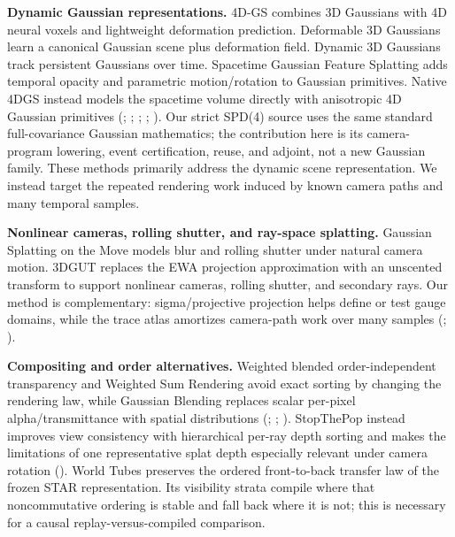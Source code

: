 \documentclass[
]{article}
\begin{document}
\textbf{Dynamic Gaussian representations.} 4D-GS combines 3D Gaussians
with 4D neural voxels and lightweight deformation prediction. Deformable
3D Gaussians learn a canonical Gaussian scene plus deformation field.
Dynamic 3D Gaussians track persistent Gaussians over time. Spacetime
Gaussian Feature Splatting adds temporal opacity and parametric
motion/rotation to Gaussian primitives. Native 4DGS instead models the
spacetime volume directly with anisotropic 4D Gaussian primitives
(;
;
;
;
). Our strict
SPD(4) source uses the same standard full-covariance Gaussian
mathematics; the contribution here is its camera-program lowering, event
certification, reuse, and adjoint, not a new Gaussian family. These
methods primarily address the dynamic scene representation. We instead
target the repeated rendering work induced by known camera paths and
many temporal samples.

\textbf{Nonlinear cameras, rolling shutter, and ray-space splatting.}
Gaussian Splatting on the Move models blur and rolling shutter under
natural camera motion. 3DGUT replaces the EWA projection approximation
with an unscented transform to support nonlinear cameras, rolling
shutter, and secondary rays. Our method is complementary:
sigma/projective projection helps define or test gauge domains, while
the trace atlas amortizes camera-path work over many samples
(;
).

\textbf{Compositing and order alternatives.} Weighted blended
order-independent transparency and Weighted Sum Rendering avoid exact
sorting by changing the rendering law, while Gaussian Blending replaces
scalar per-pixel alpha/transmittance with spatial distributions
(;
;
). StopThePop instead
improves view consistency with hierarchical per-ray depth sorting and
makes the limitations of one representative splat depth especially
relevant under camera rotation (). World Tubes preserves the ordered front-to-back transfer
law of the frozen STAR representation. Its visibility strata compile
where that noncommutative ordering is stable and fall back where it is
not; this is necessary for a causal replay-versus-compiled comparison.
\end{document}
